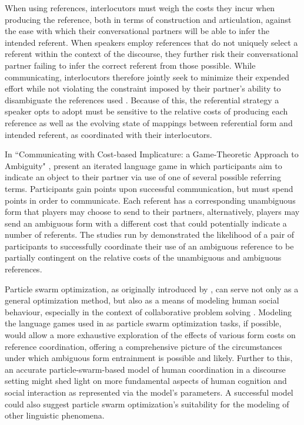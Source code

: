 \documentclass[12pt,a4paper]{article}
\begin{document}
When using references, interlocutors must weigh the costs they incur when producing the reference, both in terms of construction and articulation, against the ease with which their conversational partners will be able to infer the intended referent. When speakers employ references that do not uniquely select a referent within the context of the discourse, they further risk their conversational partner failing to infer the correct referent from those possible. While communicating, interlocutors therefore jointly seek to minimize their expended effort while not violating the constraint imposed by their partner's ability to disambiguate the references used \citep[p.~65-66]{benz2005}. Because of this, the referential strategy a speaker opts to adopt must be sensitive to the relative costs of producing each reference as well as the evolving state of mappings between referential form and intended referent, as coordinated with their interlocutors. 

In ``Communicating with Cost-based Implicature: a Game-Theoretic Approach to Ambiguity" \citeyearpar{rohde2012}, \citeauthor{rohde2012} present an iterated language game in which participants aim to indicate an object to their partner via use of one of several possible referring terms. Participants gain points upon successful communication, but must spend points in order to communicate. Each referent has a corresponding unambiguous form that players may choose to send to
their partners, alternatively, players may send an ambiguous form with a different cost that could potentially indicate a number of referents. The studies run by \citeauthor{rohde2012} demonstrated the likelihood of a pair of participants to successfully coordinate their use of an ambiguous reference to be partially contingent on the relative costs of the unambiguous and ambiguous references.

Particle swarm optimization, as originally introduced by \citet*{kennedy1995}, can serve not only as a general optimization method, but also as a means of modeling human social behaviour, especially in the context of collaborative problem solving \citep{kennedy1997}. Modeling the language games used in \citeauthor{rohde2012} as particle swarm optimization tasks, if possible, would allow a more exhaustive exploration of the effects of various form costs on reference coordination, offering a comprehensive picture of the circumstances under which ambiguous form entrainment is possible and likely. Further to this, an accurate particle-swarm-based model of human coordination in a discourse setting might shed light on more fundamental aspects of human cognition and social interaction as represented via the model's parameters. A successful model could also suggest particle swarm optimization's suitability for the modeling of other linguistic phenomena. 
\end{document}
